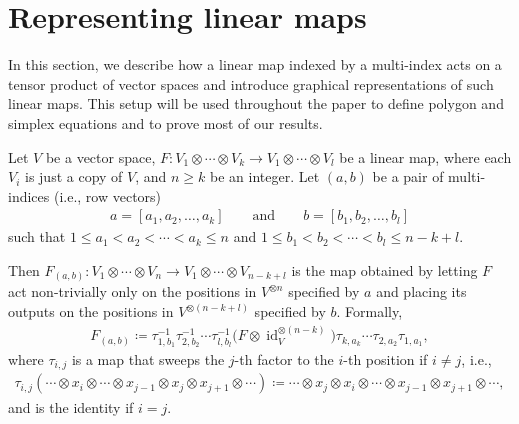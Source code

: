 \documentclass[pdftex]{sigma}
\numberwithin{equation}{section}
\theoremstyle{definition}
\begin{document}
\section{Representing linear maps}\label{sec:representing_linear_maps}

In this section, we describe how a linear map indexed by a multi-index acts on a tensor product of vector spaces and introduce graphical representations of such linear maps. This setup will be used throughout the paper to define polygon and simplex equations and to prove most of our results.


Let $V$ be a vector space, $F\colon V_1\otimes \cdots \otimes V_k\to V_1\otimes \cdots \otimes V_l$ be a linear map, where each $V_i$ is just a copy of $V$, and $n\geq k$ be an integer.
Let $(a,b)$ be a pair of multi-indices (i.e., row vectors)
\begin{align*}
 a=[ a_{1},a_{2},\dots, a_{k} ]\qquad \text{and} \qquad b=[ b_{1},b_{2},\dots, b_{l} ]
\end{align*}
such that $1\le a_1<a_2<\cdots<a_k\le n$ and $1\le b_1<b_2<\cdots< b_l\le n-k+l$.

Then $F_{(a,b)}\colon V_1\otimes \cdots \otimes V_n\to V_1\otimes \cdots \otimes V_{n-k+l}$ is the map obtained by letting $F$ act non-trivially only on the positions in $V^{\otimes n}$ specified by $a$ and placing its outputs on the positions in $V^{\otimes (n-k+l)}$ specified by $b$.
Formally, \begin{align*}
 F_{(a,b)}\coloneqq\tau_{1,b_1}^{-1} \tau_{2,b_2}^{-1} \cdots \tau_{l,b_l}^{-1}\bigl(F\otimes\operatorname{id}_V^{\otimes{(n-k)}}\bigr) \tau_{k,a_k} \cdots \tau_{2,a_2} \tau_{1,a_1},
\end{align*}
where $\tau_{i,j}$ is a map that sweeps the $j$-th factor to the $i$-th position if $i\ne j$, i.e.,
\begin{align*}
 \tau_{i,j}(\cdots \otimes x_i \otimes \cdots \otimes x_{j-1} \otimes x_j \otimes x_{j+1}\otimes \cdots ) \coloneqq \cdots \otimes x_{j} \otimes x_{i} \otimes \cdots \otimes x_{j-1} \otimes x_{j+1}\otimes\cdots,
\end{align*}
and is the identity if $i=j$.
\end{document}
